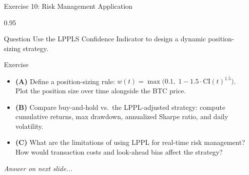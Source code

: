 \documentclass[9pt, aspectratio=169, t]{beamer}
\begin{document}
\begin{frame}{Exercise 10: Risk Management Application}
    \begin{cminipage}{0.95\textwidth}
    \begin{alertblock}{Question}
        Use the LPPLS Confidence Indicator to design a dynamic position-sizing strategy.
    \end{alertblock}

    \vspace{0.15cm}

    \begin{block}{Exercise}
        \begin{itemize}\setlength{\itemsep}{3pt}
            \item \textcolor{MainBlue}{\textbf{(A)}} Define a position-sizing rule: $w(t) = \max\bigl(0.1,\; 1 - 1.5 \cdot \text{CI}(t)^{1.5}\bigr)$. Plot the position size over time alongside the BTC price.
            \item \textcolor{MainBlue}{\textbf{(B)}} Compare buy-and-hold vs.\ the LPPL-adjusted strategy: compute cumulative returns, max drawdown, annualized Sharpe ratio, and daily volatility.
            \item \textcolor{MainBlue}{\textbf{(C)}} What are the limitations of using LPPL for real-time risk management? How would transaction costs and look-ahead bias affect the strategy?
        \end{itemize}
    \end{block}

    \vspace{0.1cm}

    \begin{center}
        \textit{Answer on next slide...}
    \end{center}
    \end{cminipage}
\end{frame}
\end{document}
